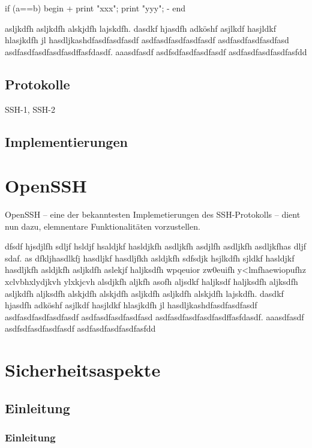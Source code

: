 \documentclass[ngerman,pdf]{wkcms}    %
\begin{document}
\begin{program}
if (a==b)
begin
  \tab+
  print "xxx";
  print "yyy";
  \tab-
end
\end{program}

asljkdfh asljkdfh alskjdfh lajskdfh. dasdkf hjasdfh adköshf asjlkdf hasjldkf
hlasjkdfh jl hasdljkashdfasdfasdfasdf asdfasdfasdfasdfasdf asdfasdfasdfasdfasd
asdfasdfasdfasdfasdffasfdasdf. aaasdfasdf asdfsdfasdfasdfasdf asdfasdfasdfasdfasfdd 

\subsection{Protokolle}
SSH-1, SSH-2

\subsection{Implementierungen}

\section{OpenSSH}

OpenSSH -- eine der bekanntesten Implemetierungen des SSH-Protokolls -- dient nun dazu,
elemnentare Funktionalitäten vorzustellen. 


dfsdf hjsdjlfh sdljf hsldjf hsaldjkf hasldjkfh asdljkfh asdjlfh asdljkfh
asdljkfhas dljf sdaf. as dfkljhasdlkfj hasdljkf hasdljfkh asldjkfh sdfsdjk
hsjlkdfh sjldkf hasldjkf hasdljkfh asldjkfh asljkdfh aslekjf haljksdfh
wpqeuior zw0euifh y<lmfhaewiopufhz xclvbhxlydjkvh ylxkjcvh alsdjkfh aljkfh
asofh aljsdkf haljksdf haljksdfh aljksdfh asljkdfh aljksdfh alskjdfh alskjdfh
asljkdfh asljkdfh alskjdfh lajskdfh. dasdkf hjasdfh adköshf asjlkdf hasjldkf
hlasjkdfh jl hasdljkashdfasdfasdfasdf asdfasdfasdfasdfasdf asdfasdfasdfasdfasd
asdfasdfasdfasdfasdffasfdasdf. aaasdfasdf asdfsdfasdfasdfasdf asdfasdfasdfasdfasfdd 

\newpage

\section*{Sicherheitsaspekte}
\subsection*{Einleitung}
\subsubsection*{Einleitung}
\end{document}
